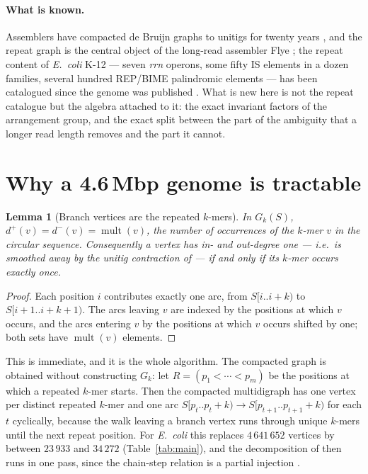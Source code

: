 \documentclass[11pt]{article}
\theoremstyle{plain}
\newtheorem{lemma}[theorem]{Lemma}
\theoremstyle{definition}
\theoremstyle{remark}
\begin{document}
\paragraph{What is known.} Assemblers have compacted de Bruijn graphs to unitigs for
twenty years \cite{PTW,KM,BCALM}, and the repeat graph is the central object of the
long-read assembler Flye \cite{PTT,Flye}; the repeat content of \emph{E.\ coli} K-12 ---
seven \emph{rrn} operons, some fifty IS elements in a dozen families, several hundred
REP/BIME palindromic elements --- has been catalogued since the genome was published
\cite{Blattner}. What is new here is not the repeat catalogue but the algebra attached to
it: the exact invariant factors of the arrangement group, and the exact split between the
part of the ambiguity that a longer read length removes and the part it cannot.

\section{Why a 4.6\,Mbp genome is tractable}\label{sec:scaling}

\begin{lemma}[Branch vertices are the repeated $k$-mers]\label{lem:branch}
In $G_k(S)$, $d^{+}(v)=d^{-}(v)=\operatorname{mult}(v)$, the number of occurrences of the
$k$-mer $v$ in the circular sequence. Consequently a vertex has in- and out-degree one
--- i.e.\ is smoothed away by the unitig contraction of \cite[Lem.~4]{Bio1} --- if and
only if its $k$-mer occurs exactly once.
\end{lemma}

\begin{proof}
Each position $i$ contributes exactly one arc, from $S[i..i{+}k)$ to $S[i{+}1..i{+}k{+}1)$.
The arcs leaving $v$ are indexed by the positions at which $v$ occurs, and the arcs
entering $v$ by the positions at which $v$ occurs shifted by one; both sets have
$\operatorname{mult}(v)$ elements.
\end{proof}

This is immediate, and it is the whole algorithm. The compacted graph is obtained without
constructing $G_k$: let $R=(p_1<\cdots<p_m)$ be the positions at which a repeated $k$-mer
starts. Then the compacted multidigraph has one vertex per distinct repeated $k$-mer and
one arc $S[p_t..p_t{+}k)\to S[p_{t+1}..p_{t+1}{+}k)$ for each $t$ cyclically, because the
walk leaving a branch vertex runs through unique $k$-mers until the next repeat position.
For \emph{E.\ coli} this replaces $4\,641\,652$ vertices by between $23\,933$ and
$34\,272$ (Table~\ref{tab:main}), and the decomposition of \cite{Bio3} then runs in one
pass, since the chain-step relation is a partial injection \cite[Lem.~6]{Bio3}.
\end{document}
